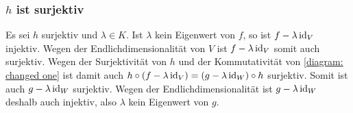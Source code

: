 \subsubsection{\texorpdfstring{$h$}{h} ist surjektiv}

Es sei $h$ surjektiv und $\lambda \in K$.
Ist $\lambda$ kein Eigenwert von $f$, so ist $f - \lambda \operatorname{id}_V$ injektiv.
Wegen der Endlichdimensionalität von $V$ ist $f - \lambda \operatorname{id}_V$ somit auch surjektiv.
Wegen der Surjektivität von $h$ und der Kommutativität von \eqref{diagram: changed one} ist damit auch $h \circ (f - \lambda \operatorname{id}_V) = (g - \lambda \operatorname{id}_W) \circ h$ surjektiv.
Somit ist auch $g - \lambda \operatorname{id}_W$ surjektiv.
Wegen der Endlichdimensionalität ist $g - \lambda \operatorname{id}_W$ deshalb auch injektiv, also $\lambda$ kein Eigenwert von $g$.















